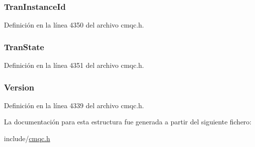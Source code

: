 \subsubsection[{Tran\+Instance\+Id}]{ Tran\+Instance\+Id}\label{structtag_m_q_i_i_h_aa6e8ee527bdecf4daf2b784caeebf996}


Definición en la línea 4350 del archivo cmqc.\+h.

\hypertarget{structtag_m_q_i_i_h_ab37c3f1862147c56720563481605b360}{}
\subsubsection[{Tran\+State}]{ Tran\+State}\label{structtag_m_q_i_i_h_ab37c3f1862147c56720563481605b360}


Definición en la línea 4351 del archivo cmqc.\+h.

\hypertarget{structtag_m_q_i_i_h_a0656ef8f766b3907d394d88a35d7b7e9}{}
\subsubsection[{Version}]{ Version}\label{structtag_m_q_i_i_h_a0656ef8f766b3907d394d88a35d7b7e9}


Definición en la línea 4339 del archivo cmqc.\+h.



La documentación para esta estructura fue generada a partir del siguiente fichero\+:\begin{DoxyCompactItemize}
\item 
include/\hyperlink{cmqc_8h}{cmqc.\+h}\end{DoxyCompactItemize}
